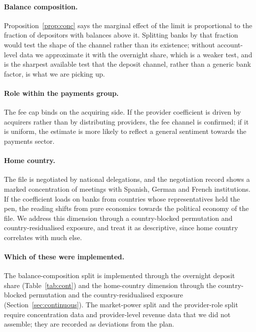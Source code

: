 \documentclass[11pt]{article}
\theoremstyle{plain}\newtheorem{proposition}{Proposition}
\begin{document}
\paragraph{Balance composition.} Proposition~\ref{prop:conc} says the marginal effect of the limit is proportional to the fraction of depositors with balances above it. Splitting banks by that fraction would test the shape of the channel rather than its existence; without account-level data we approximate it with the overnight share, which is a weaker test, and is the sharpest available test that the deposit channel, rather than a generic bank factor, is what we are picking up.

\paragraph{Role within the payments group.} The fee cap binds on the acquiring side. If the provider coefficient is driven by acquirers rather than by distributing providers, the fee channel is confirmed; if it is uniform, the estimate is more likely to reflect a general sentiment towards the payments sector.

\paragraph{Home country.} The file is negotiated by national delegations, and the negotiation record shows a marked concentration of meetings with Spanish, German and French institutions. If the coefficient loads on banks from countries whose representatives held the pen, the reading shifts from pure economics towards the political economy of the file. We address this dimension through a country-blocked permutation and country-residualised exposure, and treat it as descriptive, since home country correlates with much else.

\paragraph{Which of these were implemented.} The balance-composition split is implemented through the overnight deposit share (Table~\ref{tab:cont}) and the home-country dimension through the country-blocked permutation and the country-residualised exposure (Section~\ref{sec:continuous}). The market-power split and the provider-role split require concentration data and provider-level revenue data that we did not assemble; they are recorded as deviations from the plan.
\end{document}
